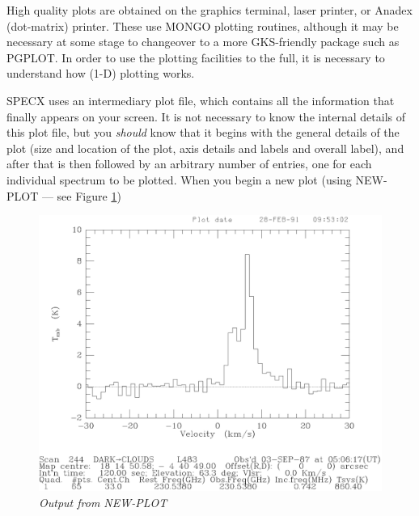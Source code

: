\documentclass[11pt,twoside]{report}
\begin{document}
High quality plots are obtained on the graphics terminal, laser printer, or Anadex
(dot-matrix) printer. These use
MONGO plotting routines, although it may be necessary at some
stage to changeover to a more GKS-friendly package such as
PGPLOT. In order to use the plotting facilities to the full, it
is necessary to understand how (1-D) plotting works. 

SPECX uses an intermediary plot file, which contains all the
information that finally appears on your screen. It is not necessary to know
the internal details of this plot file, but you {\em should} know that it
begins with the general details of the plot (size and location of the plot,
axis details and labels and overall label), and after that is then followed by
an arbitrary number of entries, one for each individual spectrum to be plotted.
When you begin a new plot (using NEW-PLOT --- see Figure \ref{NEW})
\begin{figure}[htbp]
\begin{center}
\includegraphics[scale=0.65]{new-plot.ps}
\protect\parbox{5.5in}
{\caption[NEW]
{\sl
Output from NEW-PLOT
\label{NEW}
}
}
\end{center}
\end{figure}
\end{document}
